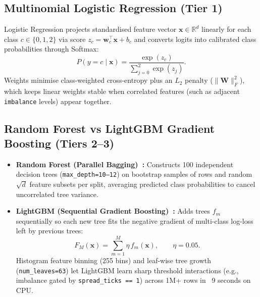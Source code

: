 \documentclass[12pt,a4paper,oneside]{report}
\newcommand{\code}[1]{\texttt{#1}}
\begin{document}
\subsection{Multinomial Logistic Regression (Tier 1)}
Logistic Regression projects standardised feature vector $\mathbf{x} \in \mathbb{R}^d$ linearly for each class $c \in \{0,1,2\}$ via score $z_c = \mathbf{w}_c^\top \mathbf{x} + b_c$ and converts logits into calibrated class probabilities through Softmax:
\begin{equation}
  P(y = c \mid \mathbf{x}) = \frac{\exp(z_c)}{\sum_{j=0}^{2} \exp(z_j)}.
\end{equation}
Weights minimise class-weighted cross-entropy plus an $L_2$ penalty ($\|\mathbf{W}\|_F^2$), which keeps linear weights stable when correlated features (such as adjacent \code{imbalance} levels) appear together.

\subsection{Random Forest vs LightGBM Gradient Boosting (Tiers 2--3)}
\begin{itemize}
  \item \textbf{Random Forest (Parallel Bagging)~\cite{breiman2001}:} Constructs 100 independent decision trees (\code{max\_depth=10--12}) on bootstrap samples of rows and random $\sqrt{d}$ feature subsets per split, averaging predicted class probabilities to cancel uncorrelated tree variance.
  \item \textbf{LightGBM (Sequential Gradient Boosting)~\cite{ke2017}:} Adds trees $f_m$ sequentially so each new tree fits the negative gradient of multi-class log-loss left by previous trees:
  \begin{equation}
    F_M(\mathbf{x}) = \sum_{m=1}^{M} \eta\, f_m(\mathbf{x}), \qquad \eta = 0.05.
  \end{equation}
  Histogram feature binning (255 bins) and leaf-wise tree growth (\code{num\_leaves=63}) let LightGBM learn sharp threshold interactions (e.g., imbalance gated by \code{spread\_ticks == 1}) across 1M+ rows in ~9 seconds on CPU.
\end{itemize}
\end{document}
